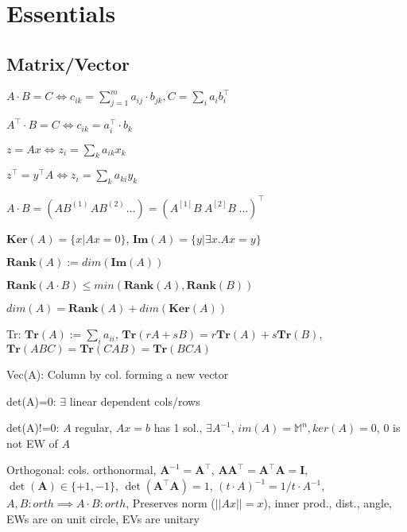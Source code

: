 \section{Essentials}
\subsection*{Matrix/Vector}
\begin{compactdesc}
	\item $A\cdot B = C \Leftrightarrow c_{ik}=\sum_{j=1}^{m} a_{ij} \cdot b_{jk}, C=\sum_{i} a_i b_i^\top$
	\item $A^\top\cdot B = C \Leftrightarrow c_{ik}=a_i^\top \cdot b_k$
	\item $z=Ax\Leftrightarrow z_i=\sum_k a_{ik} x_k$
	\item $z^\top = y^\top A \Leftrightarrow z_i = \sum_k a_{ki} y_k$
	\item $A\cdot B=(A B^{(1)}\hspace{1pt} AB^{(2)}\hspace{1pt} \dots)=(A^{[1]}B\hspace{3pt}A^{[2]}B\hspace{3pt}\dots)^\top$
	\item $\mathbf{Ker}(A)=\{x|Ax=0\}$, $\mathbf{Im}(A)=\{y|\exists x.Ax=y\}$
	\item $\mathbf{Rank}(A) := dim(\mathbf{Im}(A))$
	\item $\mathbf{Rank}(A\cdot B) \leq min(\mathbf{Rank}(A), \mathbf{Rank}(B))$
	\item $dim(A)=\mathbf{Rank}(A) + dim(\mathbf{Ker}(A))$
	\item[Tr:] $\mathbf{Tr}(A) := \sum_i a_{ii}$, $\mathbf{Tr}(rA+sB)=r\mathbf{Tr}(A)+s\mathbf{Tr}(B)$, $\mathbf{Tr}(ABC)=\mathbf{Tr}(CAB)=\mathbf{Tr}(BCA)$
	\item[Vec(A):] Column by col. forming a new vector
	\item[det(A)=0:] $\exists$ linear dependent cols/rows
	\item[det(A)!=0:] $A$ regular, $Ax=b$ has 1 sol., $\exists A^{-1}$, $im(A)=\mathbb{M}^n, ker(A)=0$, 0 is not EW of $A$
	\item[Orthogonal:] cols. orthonormal, $\mathbf{A}^{-1} = \mathbf{A}^\top$, $\mathbf{A} \mathbf{A}^\top = \mathbf{A}^\top \mathbf{A} = \mathbf{I}$, $\operatorname{det}(\mathbf{A}) \in \{+1, -1\}$, $\operatorname{det}(\mathbf{A}^\top \mathbf{A}) = 1$, $(t\cdot A)^{-1}=1/t\cdot A^{-1}$, $A, B: orth \implies A\cdot B: orth$, Preserves norm ($||Ax||=x$), inner prod., dist., angle, EWs are on unit circle, EVs are unitary

\end{compactdesc}
